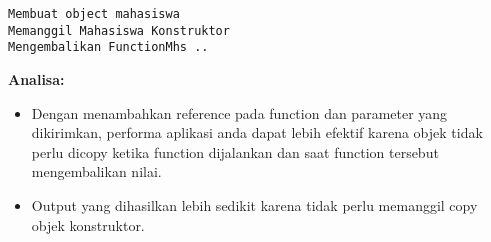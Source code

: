 \begin{verbatim}
Membuat object mahasiswa
Memanggil Mahasiswa Konstruktor
Mengembalikan FunctionMhs ..
\end{verbatim}

\textbf{Analisa:}

\begin{itemize}
\tightlist
\item
  Dengan menambahkan reference pada function dan parameter yang
  dikirimkan, performa aplikasi anda dapat lebih efektif karena objek
  tidak perlu dicopy ketika function dijalankan dan saat function
  tersebut mengembalikan nilai.
\item
  Output yang dihasilkan lebih sedikit karena tidak perlu memanggil copy
  objek konstruktor.
\end{itemize}
